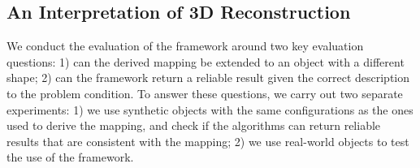 \subsection{An Interpretation of 3D Reconstruction}
We conduct the evaluation of the framework around two key evaluation questions: 1) can the derived mapping be extended to an object with a different shape; 2) can the framework return a reliable result given the correct description to the problem condition. To answer these questions, we carry out two separate experiments: 1) we use synthetic objects with the same configurations as the ones used to derive the mapping, and check if the algorithms can return reliable results that are consistent with the mapping; 2) we use real-world objects to test the use of the framework.



